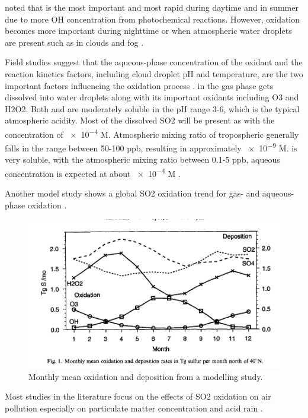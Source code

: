 \citet{eatoughConversionSO2Sulfate1994} noted that  is the most important and most rapid during daytime and in summer due to more OH concentration from photochemical reactions. However,  oxidation becomes more important during nighttime or when atmospheric water droplets are present such as in clouds and fog \cite{eatoughConversionSO2Sulfate1994}. 

Field studies suggest that the aqueous-phase concentration of the oxidant and the reaction kinetics factors, including cloud droplet pH and temperature, are the two important factors influencing the oxidation process \cite{eatoughConversionSO2Sulfate1994}.  in the gas phase gets dissolved into water droplets along with its important oxidants including O3 and H2O2. Both  and  are moderately soluble in the pH range 3-6, which is the typical atmospheric acidity. Most of the dissolved SO2 will be present as  with the concentration of \num{e-4} M. Atmospheric mixing ratio of tropospheric  generally falls in the range between 50-100 ppb, resulting in approximately \num[]{e-9} M.  is very soluble, with the atmospheric mixing ratio between 0.1-5 ppb, aqueous concentration is expected at about \num[]{e-4} M \cite{eatoughConversionSO2Sulfate1994}.


Another model study shows a global SO2 oxidation trend for gas- and aqueous-phase oxidation \cite{feichterSimulationTroposphericSulfur1996}.

\begin{figure}
    \centering
    \includegraphics[width=0.7\linewidth]{Chapter4/Figs/feitcher1996.png}
    \caption{Monthly mean  oxidation and deposition from a modelling study. \cite{feichterSimulationTroposphericSulfur1996}}
    \label{fig:feichter1996}
\end{figure}


Most studies in the literature focus on the effects of SO2 oxidation on air pollution especially on particulate matter concentration and acid rain \cite[e.g.][]{eatoughConversionSO2Sulfate1994}. 

